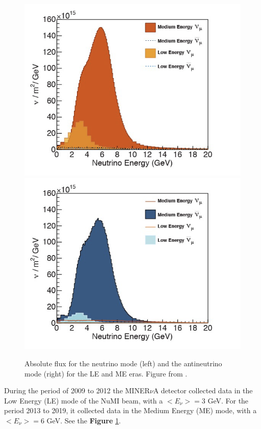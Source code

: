 \begin{figure}[!htb]
\centering
\includegraphics[scale=0.38]{Figures/Chapter2/fluxantineutrino.png}\includegraphics[scale=0.38]{Figures/Chapter2/fluxneutrino.png}
        \caption{Absolute flux for the neutrino mode (left) and the antineutrino mode (right) for the LE and ME eras. Figure from \cite{FluxPlots}.} 
\label{fig:MnvExp:NuMI:Flux}
\end{figure}

During the period of 2009 to 2012 the MINER$\nu$A detector collected data in the Low Energy (LE) mode of the NuMI beam, with a $<E_\nu> = 3$ GeV. For the period 2013 to 2019, it collected data in the Medium Energy (ME) mode, with a $<E_\nu> = 6$ GeV.  See the \textbf{Figure} \ref{fig:MnvExp:NuMI:Flux}.



